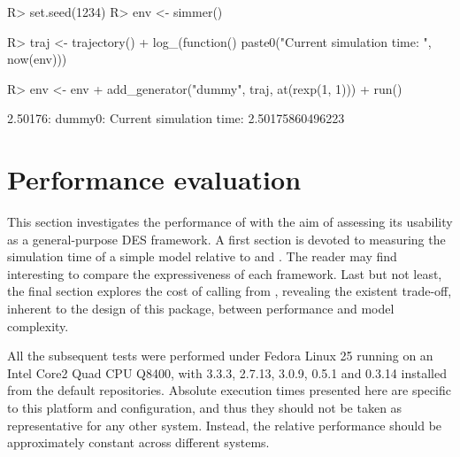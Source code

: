 \documentclass[
  nojss]{jss}
\begin{document}
\begin{CodeChunk}
\begin{CodeInput}
R> set.seed(1234)
R> env <- simmer()
\end{CodeInput}
\end{CodeChunk}

\begin{CodeChunk}
\begin{CodeInput}
R> traj <- trajectory() %
+   log_(function() paste0("Current simulation time: ", now(env)))
\end{CodeInput}
\end{CodeChunk}

\begin{CodeChunk}
\begin{CodeInput}
R> env <- env %
+   add_generator("dummy", traj, at(rexp(1, 1))) %
+   run()
\end{CodeInput}
\begin{CodeOutput}
2.50176: dummy0: Current simulation time: 2.50175860496223
\end{CodeOutput}
\end{CodeChunk}

\hypertarget{performance-evaluation}{%
\section{Performance evaluation}\label{performance-evaluation}}

This section investigates the performance of  with the aim
of assessing its usability as a general-purpose DES framework. A first
section is devoted to measuring the simulation time of a simple model
relative to  and . The reader may find
interesting to compare the expressiveness of each framework. Last but
not least, the final section explores the cost of calling 
from , revealing the existent trade-off, inherent to the
design of this package, between performance and model complexity.

All the subsequent tests were performed under Fedora Linux 25 running on
an Intel Core2 Quad CPU Q8400, with  3.3.3,
 2.7.13,  3.0.9,  0.5.1 and
 0.3.14 installed from the default repositories. Absolute
execution times presented here are specific to this platform and
configuration, and thus they should not be taken as representative for
any other system. Instead, the relative performance should be
approximately constant across different systems.
\end{document}
